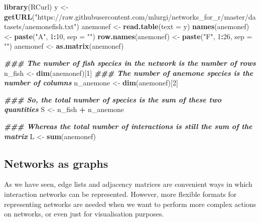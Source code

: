 \documentclass[
]{article}
\newenvironment{Shaded}{\begin{snugshade}}{\end{snugshade}}
\newcommand{\AttributeTok}[1]{\textcolor[rgb]{0.13,0.29,0.53}{#1}}
\newcommand{\DecValTok}[1]{\textcolor[rgb]{0.00,0.00,0.81}{#1}}
\newcommand{\DocumentationTok}[1]{\textcolor[rgb]{0.56,0.35,0.01}{\textbf{\textit{#1}}}}
\newcommand{\FunctionTok}[1]{\textcolor[rgb]{0.13,0.29,0.53}{\textbf{#1}}}
\newcommand{\NormalTok}[1]{#1}
\newcommand{\OtherTok}[1]{\textcolor[rgb]{0.56,0.35,0.01}{#1}}
\newcommand{\SpecialCharTok}[1]{\textcolor[rgb]{0.81,0.36,0.00}{\textbf{#1}}}
\newcommand{\StringTok}[1]{\textcolor[rgb]{0.31,0.60,0.02}{#1}}
\begin{document}
\begin{Shaded}
\begin{Highlighting}[]
\FunctionTok{library}\NormalTok{(RCurl)}
\NormalTok{y }\OtherTok{\textless{}{-}} \FunctionTok{getURL}\NormalTok{(}\StringTok{"https://raw.githubusercontent.com/mlurgi/networks\_for\_r/master/datasets/anemonefish.txt"}\NormalTok{)}
\NormalTok{anemonef }\OtherTok{\textless{}{-}} \FunctionTok{read.table}\NormalTok{(}\AttributeTok{text =}\NormalTok{ y)}
\FunctionTok{names}\NormalTok{(anemonef) }\OtherTok{\textless{}{-}} \FunctionTok{paste}\NormalTok{(}\StringTok{"A"}\NormalTok{, }\DecValTok{1}\SpecialCharTok{:}\DecValTok{10}\NormalTok{, }\AttributeTok{sep =} \StringTok{""}\NormalTok{)}
\FunctionTok{row.names}\NormalTok{(anemonef) }\OtherTok{\textless{}{-}} \FunctionTok{paste}\NormalTok{(}\StringTok{"F"}\NormalTok{, }\DecValTok{1}\SpecialCharTok{:}\DecValTok{26}\NormalTok{, }\AttributeTok{sep =} \StringTok{""}\NormalTok{)       }
\NormalTok{anemonef }\OtherTok{\textless{}{-}} \FunctionTok{as.matrix}\NormalTok{(anemonef)}

\DocumentationTok{\#\#\# The number of fish species in the network is the number of rows}
\NormalTok{n\_fish }\OtherTok{\textless{}{-}} \FunctionTok{dim}\NormalTok{(anemonef)[}\DecValTok{1}\NormalTok{]}
\DocumentationTok{\#\#\# The number of anemone species is the number of columns}
\NormalTok{n\_anemone }\OtherTok{\textless{}{-}} \FunctionTok{dim}\NormalTok{(anemonef)[}\DecValTok{2}\NormalTok{]}

\DocumentationTok{\#\#\# So, the total number of species is the sum of these two quantities}
\NormalTok{S }\OtherTok{\textless{}{-}}\NormalTok{ n\_fish }\SpecialCharTok{+}\NormalTok{ n\_anemone}

\DocumentationTok{\#\#\# Whereas the total number of interactions is still the sum of the matrix}
\NormalTok{L }\OtherTok{\textless{}{-}} \FunctionTok{sum}\NormalTok{(anemonef)}
\end{Highlighting}
\end{Shaded}

\subsection{Networks as graphs}\label{networks-as-graphs}

As we have seen, edge lists and adjacency matrices are convenient ways
in which interaction networks can be represented. However, more flexible
formats for representing networks are needed when we want to perform
more complex actions on networks, or even just for visualisation
purposes.
\end{document}
